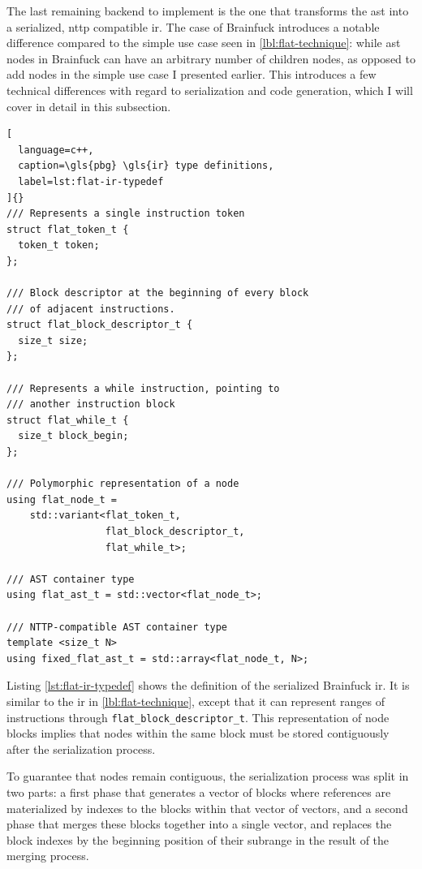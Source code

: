 \documentclass[../main]{subfiles}
\begin{document}
The last remaining backend to implement is the one that transforms
the \gls{ast} into a serialized, \gls{nttp} compatible \gls{ir}.
The case of Brainfuck introduces a notable difference compared to the simple
use case seen in \ref{lbl:flat-technique}: while \gls{ast} nodes in Brainfuck
can have an arbitrary number of children nodes, as opposed to add nodes in
the simple use case I presented earlier. This introduces a few technical
differences with regard to serialization and code generation, which I will
cover in detail in this subsection.

\begin{lstlisting}[
  language=c++,
  caption=\gls{pbg} \gls{ir} type definitions,
  label=lst:flat-ir-typedef
]{}
/// Represents a single instruction token
struct flat_token_t {
  token_t token;
};

/// Block descriptor at the beginning of every block
/// of adjacent instructions.
struct flat_block_descriptor_t {
  size_t size;
};

/// Represents a while instruction, pointing to
/// another instruction block
struct flat_while_t {
  size_t block_begin;
};

/// Polymorphic representation of a node
using flat_node_t =
    std::variant<flat_token_t,
                 flat_block_descriptor_t,
                 flat_while_t>;

/// AST container type
using flat_ast_t = std::vector<flat_node_t>;

/// NTTP-compatible AST container type
template <size_t N>
using fixed_flat_ast_t = std::array<flat_node_t, N>;
\end{lstlisting}

Listing \ref{lst:flat-ir-typedef} shows the definition of the serialized
Brainfuck \gls{ir}. It is similar to the \gls{ir} in \ref{lbl:flat-technique},
except that it can represent ranges of instructions through
\lstinline{flat_block_descriptor_t}. This representation of node blocks
implies that nodes within the same block must be stored contiguously
after the serialization process.

To guarantee that nodes remain contiguous, the serialization process was split
in two parts: a first phase that generates a vector of blocks where references
are materialized by indexes to the blocks within that vector of vectors,
and a second phase that merges these blocks together into a single vector,
and replaces the block indexes by the beginning position of their subrange
in the result of the merging process.
\end{document}
